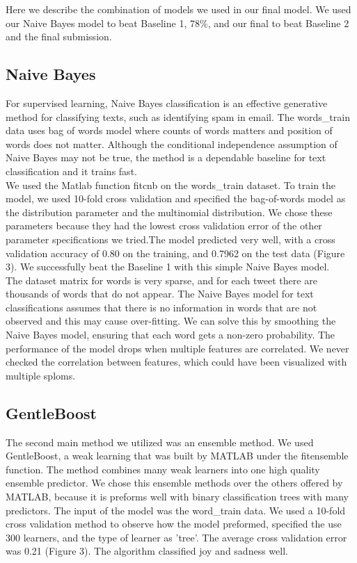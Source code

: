 \documentclass[]{article}
\begin{document}
Here we describe the combination of models we used in our final model. We used our Naive Bayes model to beat Baseline 1, 78\%, and our final to beat Baseline 2 and the final submission. 


\subsection{Naive Bayes}

For supervised learning, Naive Bayes classification is an effective generative method for classifying texts, such as identifying spam in email. The words\_train data uses bag of words model where counts of words matters and position of words does not matter. Although the conditional independence assumption of  Naive Bayes may not be true, the method is a dependable baseline for text classification and it trains fast. \\

We used the  Matlab function fitcnb on the words\_train dataset. To train the model, we used 10-fold cross validation and specified the bag-of-words model as the distribution parameter and the multinomial distribution. We chose these parameters because they had the lowest cross validation error of the other parameter specifications we tried.The model predicted very well, with a cross validation accuracy of 0.80 on the training, and 0.7962 on the test data (Figure 3). We successfully beat the Baseline 1 with this simple Naive Bayes model. \\

The dataset matrix for words is very sparse, and for each tweet there are thousands of words that do not appear. The Naive Bayes model for text classifications assumes that there is no information in words that are not observed and this may cause over-fitting. We can solve this by smoothing the Naive Bayes model, ensuring that each word gets a non-zero probability. The performance of the model drops when multiple features are correlated. We never checked the correlation between features, which could have been visualized with multiple sploms. 

\subsection{GentleBoost}

The second main method we utilized was an ensemble method. We used GentleBoost, a weak learning that was built by MATLAB under the fitensemble function. The method combines many weak learners into one high quality ensemble predictor. We chose this ensemble methods over the others offered by MATLAB, because it is preforms well with binary classification trees with many predictors. The input of the model was the word\_train data. We used a 10-fold cross validation method to observe how the model preformed, specified the use 300 learners, and the type of learner as 'tree'. The average cross validation error was 0.21 (Figure 3). The algorithm classified joy and sadness well. \\
\end{document}
